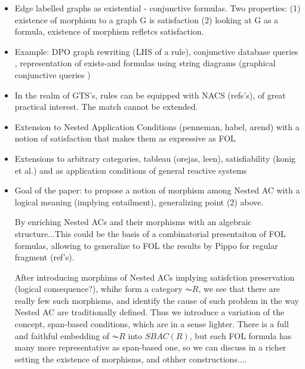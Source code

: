 \begin{itemize}
    \item Edge labelled graphs as existential - conjunctive formulas. Two properties: (1) existence of morphism to a graph G is satisfaction (2) looking at G as a formula, existence of morphism refletcs satisfaction.
    \item Example: DPO graph rewriting (LHS of a rule), conjunctive database queries \cite{DBLP:conf/stoc/ChandraM77}, representation of exists-and formulas using string diagrams (graphical conjunctive queries \cite{DBLP:conf/csl/BonchiSS18})
    \item In the realm of GTS's, rules can be equipped with NACS (refs's), of great practical interest. The match cannot be extended. 
    \item Extension to Nested Application Conditions (penneman, habel, arend) with a notion of satisfaction that makes them as expressive as FOL
    \item Extensions to arbitrary categories, tableau (orejas, leen), satisfiability (konig et al.) and as application conditions of general reactive systems
    \item  Goal of the paper: to propose a notion of morphism among Nested AC with a logical meaning (implying entailment), generalizing point (2) above. 
    
    By enriching Nested ACs and their morphisms with an algebraic structure...This could be the basis of a combinatorial presentaiton of FOL formulas, allowing to generalize to FOL the results by Pippo for regular fragment (ref's).
    
    After introducing morphims of Nested ACs implying satisfction preservation (logical consequence?), whihc form a category $\AC{R}$, we see that there are really few such morphisms, and identify the cause of such problem in the way Nested AC are traditionally defined. Thus we introduce a variation of the concept, span-based conditions, which are in a sense lighter. There is a full and faithful embedding of $\AC{R}$ into $SBAC(R)$, but each FOL formula has many more representative as span-based one, so we can discuss in a richer setting the existence of morphisms, and othher constructions....

\end{itemize}
    